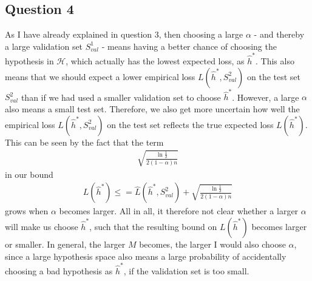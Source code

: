 \subsection{Question 4}
As I have already explained in question 3, then choosing a large $\alpha$ - and thereby a large validation set $S_{val}^1$ - means having a better chance of choosing the hypothesis in $\mathcal{H}$, which actually has the lowest expected loss, as $\hat{h}^*$. This also means that we should expect a lower empirical loss $L(\hat{h}^*,S_{val}^2)$ on the test set $S_{val}^2$ than if we had used a smaller validation set to choose $\hat{h}^*$. However, a large $\alpha$ also means a small test set. Therefore, we also get more uncertain how well the empirical loss $L(\hat{h}^*,S_{val}^2)$ on the test set reflects the true expected loss $L(\hat{h}^*)$. This can be seen by the fact that the term
\begin{align}
\sqrt{\frac{ \ln \frac{1}{\delta}}{2(1-\alpha)n}}
\end{align}
in our bound
\begin{align}
L(\hat{h}^*) \leq = \hat{L}(\hat{h}^*, S_{val}^2) + \sqrt{\frac{ \ln \frac{1}{\delta}}{2(1-\alpha)n}}
\end{align}
grows when $\alpha$ becomes larger. All in all, it therefore not clear whether a larger $\alpha$ will make us choose $\hat{h}^*$, such that the resulting bound on $L(\hat{h}^*)$ becomes larger or smaller. In general, the larger $M$ becomes, the larger I would also choose $\alpha$, since a large hypothesis space also means a large probability of accidentally choosing a bad hypothesis as $\hat{h}^*$, if the validation set is too small.